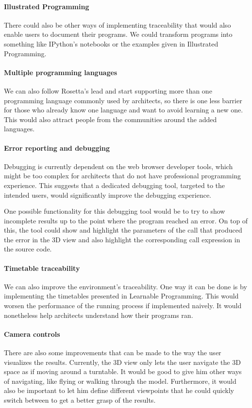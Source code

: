 \paragraph{Illustrated Programming}
There could also be other ways of implementing traceability that would also enable users to document their programs.
We could transform programs into something like IPython's notebooks or the examples given in Illustrated Programming\cite{Leitao2014illustrated}.

\paragraph{Multiple programming languages}
We can also follow Rosetta's lead and start supporting more than one programming language commonly used by architects, so there is one less barrier for those who already know one language and want to avoid learning a new one.
This would also attract people from the communities around the added languages.

\paragraph{Error reporting and debugging}
Debugging is currently dependent on the web browser developer tools, which might be too complex for architects that do not have professional programming experience.
This suggests that a dedicated debugging tool, targeted to the intended users, would significantly improve the debugging experience.

One possible functionality for this debugging tool would be to try to show incomplete results up to the point where the program reached an error.
On top of this, the tool could show and highlight the parameters of the call that produced the error in the 3D view and also highlight the corresponding call expression in the source code.

\paragraph{Timetable traceability}
We can also improve the environment's traceability.
One way it can be done is by implementing the timetables presented in Learnable Programming\cite{victor2012learnable}.
This would worsen the performance of the running process if implemented naively.
It would nonetheless help architects understand how their programs ran.

\paragraph{Camera controls}
There are also some improvements that can be made to the way the user visualizes the results.
Currently, the 3D view only lets the user navigate the 3D space as if moving around a turntable.
It would be good to give him other ways of navigating, like flying or walking through the model.
Furthermore, it would also be important to let him define different viewpoints that he could quickly switch between to get a better grasp of the results.

